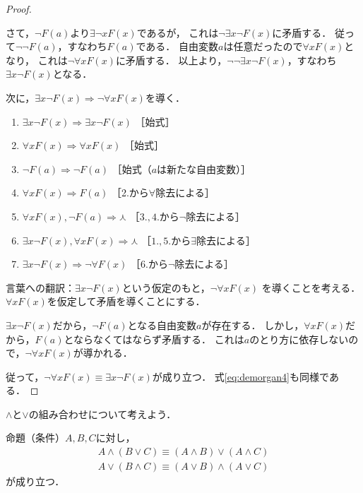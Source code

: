\begin{proof}
\begin{oframed}
       さて，$\lnot F(a)$より$\exists \lnot x F(x)$であるが，
       これは$\lnot \exists x \lnot F(x)$に矛盾する．
       従って$\lnot \lnot F(a)$，すなわち$F(a)$である．
       自由変数$a$は任意だったので$\forall x F(x)$となり，
       これは$\lnot \forall x F(x)$に矛盾する．
       以上より，$\lnot \lnot \exists x \lnot F(x) $，すなわち$\exists x \lnot F(x)$となる．
     \end{oframed}

     次に，$\exists x \lnot F(x) \Longrightarrow \lnot \forall x F(x) $を導く．
     \begin{enumerate}[1. ]
       \item $\exists x \lnot F(x) \Longrightarrow \exists x \lnot F(x)$
              \quad ［始式］
       \item $\forall x F(x) \Longrightarrow \forall x F(x) $
              \quad ［始式］
       \item $\lnot F(a) \Longrightarrow \lnot F(a) $ \quad ［始式（$a$は新たな自由変数）］
       \item $\forall x F(x) \Longrightarrow F(a)$ \quad ［2.から$\forall$除去による］
       \item $\forall x F(x) ,  \lnot F(a) \Longrightarrow \curlywedge$
              \quad ［$3., 4.$から$\lnot$除去による］
       \item $\exists x \lnot F(x) ,  \forall x F(x) \Longrightarrow \curlywedge$
              \quad ［$1., 5.$から$\exists$除去による］
       \item $\exists x \lnot F(x) \Longrightarrow \lnot \forall F(x)$
              \quad ［6.から$\lnot$除去による］
     \end{enumerate}
     \begin{oframed}
       言葉への翻訳：$\exists x \lnot F(x)$という仮定のもと，$\lnot \forall x F(x)$
       を導くことを考える．$\forall x F(x)$を仮定して矛盾を導くことにする．

       $\exists x \lnot F(x)$だから，$\lnot F(a)$となる自由変数$a$が存在する．
       しかし，$\forall x F(x)$だから，$F(a)$とならなくてはならず矛盾する．
       これは$a$のとり方に依存しないので，$\lnot \forall x F(x)$が導かれる．
     \end{oframed}
     従って，$\lnot \forall x F(x) \equiv \exists x \lnot F(x)$が成り立つ．
     式\eqref{eq:demorgan4}も同様である．
   \end{proof}
   $\land$と$\lor$の組み合わせについて考えよう．
   \begin{thm}[命題論理における分配律] \label{thm:bunpaimeidai}
     命題（条件）$A,  B,  C$に対し，
     \begin{align}
       A \land ( B \lor C ) \equiv (A \land B ) \lor (A \land C) 
       \label{eq:bunpailand} \\
       A \lor ( B \land C) \equiv (A \lor B) \land ( A \lor C )
       \label{eq:bunpailor}
     \end{align}
     が成り立つ．
   \end{thm}
